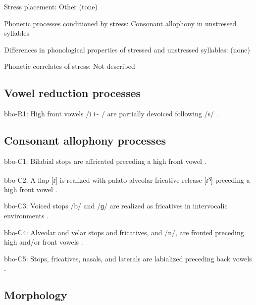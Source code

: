 {\begin{appendixdesc}
\item[Stress placement:] Other (tone)

\item[Phonetic processes conditioned by stress:] Consonant allophony in unstressed syllables

\item[Differences in phonological properties of stressed and unstressed syllables:] (none)

\item[Phonetic correlates of stress:] Not described
\end{appendixdesc}
\subsection*{Vowel reduction processes}
\begin{appendixdesc}

\item[bbo-R1:] High front vowels /i i\~{} / are partially devoiced following /s/ \citep[28--29]{Morse1976}.
\end{appendixdesc}
\subsection*{Consonant allophony processes}
\begin{appendixdesc}

\item[bbo-C1:] Bilabial stops are affricated preceding a high front vowel \citep[20]{Morse1976}.

\item[bbo-C2:] A flap [ɾ] is realized with palato-alveolar fricative release [ɾ\textsuperscript{ʒ}] preceding a high front vowel \citep[25]{Morse1976}.

\item[bbo-C3:] Voiced stops /b/ and /ɡ/ are realized as fricatives in intervocalic environments \citep[22]{Morse1976}.

\item[bbo-C4:] Alveolar and velar stops and fricatives, and /n/, are fronted preceding high and/or front vowels \citep[20--23]{Morse1976}.

\item[bbo-C5:] Stops, fricatives, nasals, and laterals are labialized preceding back vowels \citep[20]{Morse1976}.
\end{appendixdesc}
\subsection*{Morphology}

}
